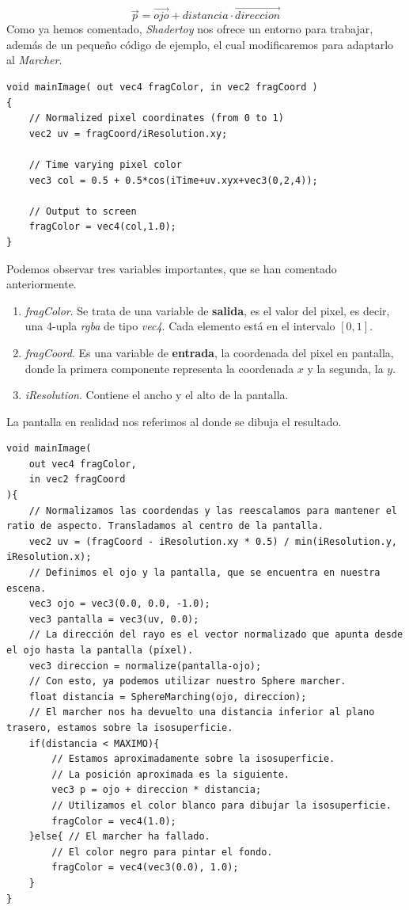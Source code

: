 \[ \Vec{p} = \Vec{ojo} + distancia \cdot  \Vec{direccion} \]
Como ya hemos comentado, \textit{Shadertoy} nos ofrece un entorno para trabajar, además de un pequeño código de ejemplo, el cual modificaremos para adaptarlo al \textit{Marcher}.
\begin{lstlisting}
void mainImage( out vec4 fragColor, in vec2 fragCoord )
{
    // Normalized pixel coordinates (from 0 to 1)
    vec2 uv = fragCoord/iResolution.xy;

    // Time varying pixel color
    vec3 col = 0.5 + 0.5*cos(iTime+uv.xyx+vec3(0,2,4));

    // Output to screen
    fragColor = vec4(col,1.0);
}
\end{lstlisting}
Podemos observar tres variables importantes, que se han comentado anteriormente.
\begin{enumerate}
    \item \textit{fragColor}. Se trata de una variable de \textbf{salida}, es el valor del pixel, es decir, una 4-upla \textit{rgba} de tipo \textit{vec4}. Cada elemento está en el intervalo \([0,1]\).
    \item \textit{fragCoord}. Es una variable de \textbf{entrada}, la coordenada del pixel en pantalla, donde la primera componente representa la coordenada \(x\) y la segunda, la \(y\).
    \item \textit{iResolution}. Contiene el ancho y el alto de la pantalla.
\end{enumerate}
La pantalla en realidad nos referimos al donde se dibuja el resultado.
\newpage
\begin{lstlisting}
void mainImage(
    out vec4 fragColor, 
    in vec2 fragCoord
){
    // Normalizamos las coordendas y las reescalamos para mantener el ratio de aspecto. Transladamos al centro de la pantalla.
    vec2 uv = (fragCoord - iResolution.xy * 0.5) / min(iResolution.y, iResolution.x);
    // Definimos el ojo y la pantalla, que se encuentra en nuestra escena.
    vec3 ojo = vec3(0.0, 0.0, -1.0);
    vec3 pantalla = vec3(uv, 0.0);
    // La dirección del rayo es el vector normalizado que apunta desde el ojo hasta la pantalla (píxel).
    vec3 direccion = normalize(pantalla-ojo);
    // Con esto, ya podemos utilizar nuestro Sphere marcher.
    float distancia = SphereMarching(ojo, direccion);
    // El marcher nos ha devuelto una distancia inferior al plano trasero, estamos sobre la isosuperficie.
    if(distancia < MAXIMO){
        // Estamos aproximadamente sobre la isosuperficie.
        // La posición aproximada es la siguiente.
        vec3 p = ojo + direccion * distancia;
        // Utilizamos el color blanco para dibujar la isosuperficie.
        fragColor = vec4(1.0);
    }else{ // El marcher ha fallado.
        // El color negro para pintar el fondo.
        fragColor = vec4(vec3(0.0), 1.0);
    }
}
\end{lstlisting}
